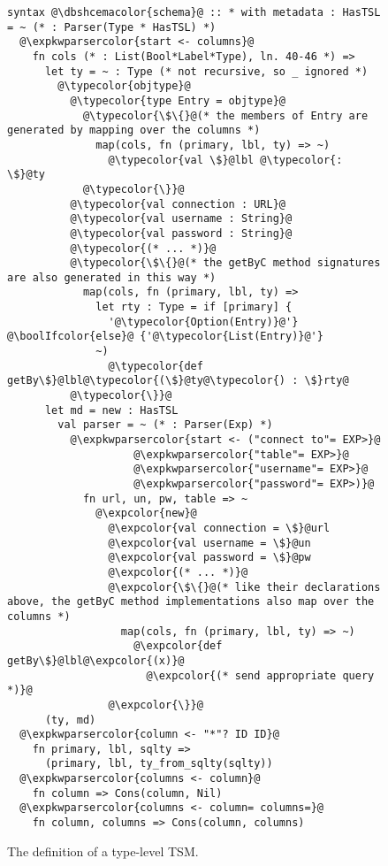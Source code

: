 \documentclass{sig-alternate}[10pt]
\newcommand{\expkwparsercolor}[1]{\textcolor[HTML]{336699}{#1}}
\newcommand{\expcolor}[1]{\textcolor[HTML]{FF0033}{#1}}
\newcommand{\typecolor}[1]{\textcolor[HTML]{660066}{#1}}
\newcommand{\boolIfcolor}[1]{\textcolor[HTML]{5E0C0C}{#1}}
\newcommand{\dbshcemacolor}[1]{\textcolor[HTML]{5AC3D1}{#1}}
\newcommand{\mycaption}[1]{\vspace{-4px}\caption{#1}\vspace{-2px}}
\begin{document}
\begin{figure}[t]
\begin{lstlisting}[style=wyvern]
syntax @\dbshcemacolor{schema}@ :: * with metadata : HasTSL = ~ (* : Parser(Type * HasTSL) *)
  @\expkwparsercolor{start <- columns}@
    fn cols (* : List(Bool*Label*Type), ln. 40-46 *) =>
      let ty = ~ : Type (* not recursive, so _ ignored *)
        @\typecolor{objtype}@ 
          @\typecolor{type Entry = objtype}@
            @\typecolor{\$\{}@(* the members of Entry are generated by mapping over the columns *)
              map(cols, fn (primary, lbl, ty) => ~)
                @\typecolor{val \$}@lbl @\typecolor{:  \$}@ty
            @\typecolor{\}}@
          @\typecolor{val connection : URL}@
          @\typecolor{val username : String}@
          @\typecolor{val password : String}@
          @\typecolor{(* ... *)}@
          @\typecolor{\$\{}@(* the getByC method signatures are also generated in this way *) 
            map(cols, fn (primary, lbl, ty) => 
              let rty : Type = if [primary] {
                '@\typecolor{Option(Entry)}@'} @\boolIfcolor{else}@ {'@\typecolor{List(Entry)}@'}
              ~)
                @\typecolor{def getBy\$}@lbl@\typecolor{(\$}@ty@\typecolor{) : \$}rty@
          @\typecolor{\}}@
      let md = new : HasTSL
        val parser = ~ (* : Parser(Exp) *)
          @\expkwparsercolor{start <- ("connect to"= EXP>}@
                    @\expkwparsercolor{"table"= EXP>}@
                    @\expkwparsercolor{"username"= EXP>}@
                    @\expkwparsercolor{"password"= EXP>)}@
            fn url, un, pw, table => ~
              @\expcolor{new}@ 
                @\expcolor{val connection = \$}@url
                @\expcolor{val username = \$}@un
                @\expcolor{val password = \$}@pw
                @\expcolor{(* ... *)}@
                @\expcolor{\$\{}@(* like their declarations above, the getByC method implementations also map over the columns *)
                  map(cols, fn (primary, lbl, ty) => ~)
                    @\expcolor{def getBy\$}@lbl@\expcolor{(x)}@ 
                      @\expcolor{(* send appropriate query *)}@
                @\expcolor{\}}@
      (ty, md)
  @\expkwparsercolor{column <- "*"? ID ID}@
    fn primary, lbl, sqlty => 
      (primary, lbl, ty_from_sqlty(sqlty))
  @\expkwparsercolor{columns <- column}@
    fn column => Cons(column, Nil)
  @\expkwparsercolor{columns <- column= columns=}@
    fn column, columns => Cons(column, columns)
\end{lstlisting}
\mycaption{The definition of a type-level TSM.}
\label{typekw-example-1}
\end{figure}
\end{document}
